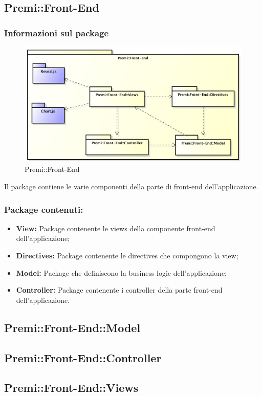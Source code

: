 \subsection{Premi::Front-End}
	\subsubsection*{Informazioni sul package}
		\begin{figure}[h]
			\centering
			\includegraphics[width=\linewidth]{img/front-end_package}
			\caption[Premi::Front-End]{Premi::Front-End}
		\end{figure}
		Il package contiene le varie componenti della parte di front-end dell'applicazione.

		\subsubsection*{Package contenuti:}
			\begin{itemize}
				\item \textbf{View:} Package contenente le views della componente front-end dell'applicazione;
				\item \textbf{Directives:} Package contenente le directives che compongono la view;
				\item \textbf{Model:} Package che definiscono la business logic dell'applicazione;
				\item \textbf{Controller:} Package contenente i controller della parte front-end dell'applicazione.
			\end{itemize}

		\subsection{Premi::Front-End::Model}
			
			\newpage

		\subsection{Premi::Front-End::Controller}
			
			\newpage

		\subsection{Premi::Front-End::Views}
			
			\newpage
